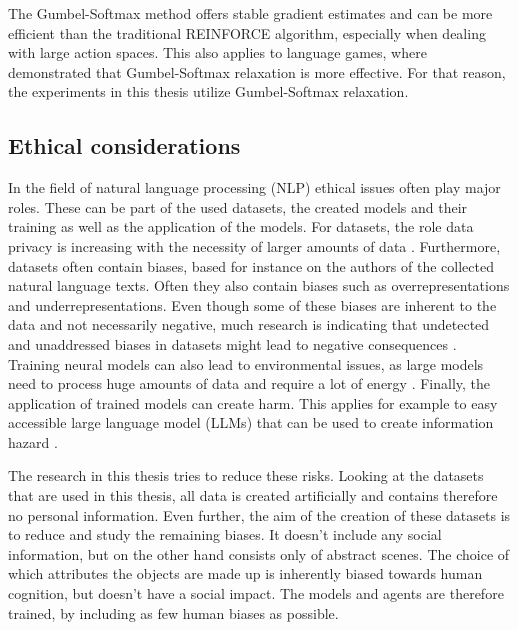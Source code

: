 The Gumbel-Softmax method offers stable gradient estimates and can be more efficient than the traditional REINFORCE algorithm, especially when dealing with large action spaces.
This also applies to language games, where \citet{Havrylov2017} demonstrated that Gumbel-Softmax relaxation is more effective.
For that reason, the experiments in this thesis utilize Gumbel-Softmax relaxation.

\subsection{Ethical considerations}
In the field of natural language processing (NLP) ethical issues often play major roles.
These can be part of the used datasets, the created models and their training as well as the application of the models.
For datasets, the role data privacy is increasing with the necessity of larger amounts of data \citep{Klymenko2022}.
Furthermore, datasets often contain biases, based for instance on the authors of the collected natural language texts. Often they also contain biases such as overrepresentations and underrepresentations.
Even though some of these biases are inherent to the data and not necessarily negative, much research is indicating that undetected and unaddressed biases in datasets might lead to negative consequences \citep{Shah2020,Field2021,Bender2021}.
Training neural models can also lead to environmental issues, as large models need to process huge amounts of data and require a lot of energy \citep{Bender2021}.
Finally, the application of trained models can create harm.
This applies for example to easy accessible large language model (LLMs) that can be used to create information hazard \citep{Weidinger2022}.

The research in this thesis tries to reduce these risks.
Looking at the datasets that are used in this thesis, all data is created artificially and contains therefore no personal information.
Even further, the aim of the creation of these datasets is to reduce and study the remaining biases.
It doesn't include any social information, but on the other hand consists only of abstract scenes.
The choice of which attributes the objects are made up is inherently biased towards human cognition, but doesn't have a social impact.
The models and agents are therefore trained, by including as few human biases as possible.

